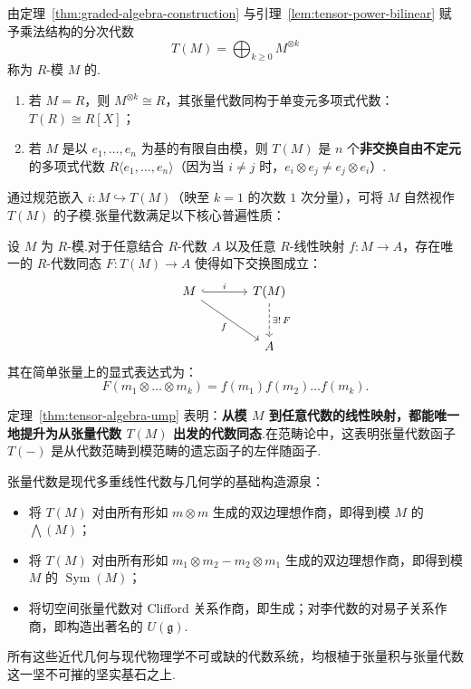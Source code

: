 \begin{definition}\label{def:tensor-algebra}
由定理~\ref{thm:graded-algebra-construction} 与引理~\ref{lem:tensor-power-bilinear} 赋予乘法结构的分次代数
\[
  T(M) = \bigoplus_{k \geq 0} M^{\otimes k}
\]
称为 $R$-模 $M$ 的.
\end{definition}

\begin{example}\label{ex:free-tensor-algebra}
\begin{enumerate}
  \item 若 $M = R$，则 $M^{\otimes k} \cong R$，其张量代数同构于单变元多项式代数：$T(R) \cong R[X]$；
  \item 若 $M$ 是以 $e_1, \dots, e_n$ 为基的有限自由模，则 $T(M)$ 是 $n$ 个\textbf{非交换自由不定元}的多项式代数 $R\langle e_1, \dots, e_n\rangle$（因为当 $i \neq j$ 时，$e_i \otimes e_j \neq e_j \otimes e_i$）.
\end{enumerate}
\end{example}

通过规范嵌入 $i \colon M \hookrightarrow T(M)$（映至 $k = 1$ 的次数 $1$ 次分量），可将 $M$ 自然视作 $T(M)$ 的子模.张量代数满足以下核心普遍性质：

\begin{theorem}[张量代数的普遍映射性质]\label{thm:tensor-algebra-ump}
设 $M$ 为 $R$-模.对于任意结合 $R$-代数 $A$ 以及任意 $R$-线性映射 $f \colon M \to A$，存在唯一的 $R$-代数同态 $F \colon T(M) \to A$ 使得如下交换图成立：
\begin{equation}
\begin{tikzcd}[row sep=large, column sep=large]
M \arrow[r, "i", hook] \arrow[dr, "f"'] & T(M) \arrow[d, "\exists!\,F", dashed] \\
& A
\end{tikzcd}
\end{equation}
其在简单张量上的显式表达式为：
\[
  F(m_1 \otimes \dots \otimes m_k) = f(m_1) f(m_2) \dots f(m_k).
\]
\end{theorem}

定理~\ref{thm:tensor-algebra-ump} 表明：\textbf{从模 $M$ 到任意代数的线性映射，都能唯一地提升为从张量代数 $T(M)$ 出发的代数同态}.在范畴论中，这表明张量代数函子 $T(-)$ 是从代数范畴到模范畴的遗忘函子的左伴随函子.

张量代数是现代多重线性代数与几何学的基础构造源泉：
\begin{itemize}
  \item 将 $T(M)$ 对由所有形如 $m \otimes m$ 生成的双边理想作商，即得到模 $M$ 的 $\bigwedge(M)$；
  \item 将 $T(M)$ 对由所有形如 $m_1 \otimes m_2 - m_2 \otimes m_1$ 生成的双边理想作商，即得到模 $M$ 的 $\operatorname{Sym}(M)$；
  \item 将切空间张量代数对 Clifford 关系作商，即生成；对李代数的对易子关系作商，即构造出著名的 $U(\mathfrak{g})$.
\end{itemize}
所有这些近代几何与现代物理学不可或缺的代数系统，均根植于张量积与张量代数这一坚不可摧的坚实基石之上.
